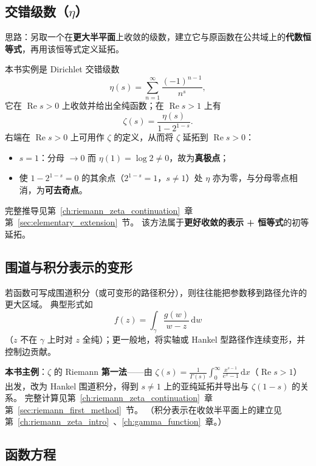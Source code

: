 \subsection{交错级数（$\eta$）}\label{subsec:eta_continuation_method}

思路：另取一个在\textbf{更大半平面}上收敛的级数，建立它与原函数在公共域上的\textbf{代数恒等式}，再用该恒等式定义延拓。

本书实例是 Dirichlet 交错级数
\[
  \eta(s)=\sum_{n=1}^{\infty}\frac{(-1)^{n-1}}{n^s},
\]
它在 $\operatorname{Re}s>0$ 上收敛并给出全纯函数；在 $\operatorname{Re}s>1$ 上有
\[
  \zeta(s)=\frac{\eta(s)}{1-2^{1-s}}.
\]
右端在 $\operatorname{Re}s>0$ 上可用作 $\zeta$ 的定义，从而将 $\zeta$ 延拓到 $\operatorname{Re}s>0$：
\begin{itemize}
  \item $s=1$：分母 $\to 0$ 而 $\eta(1)=\log 2\neq 0$，故为\textbf{真极点}；
  \item 使 $1-2^{1-s}=0$ 的其余点（$2^{1-s}=1$，$s\neq 1$）处 $\eta$ 亦为零，与分母零点相消，为\textbf{可去奇点}。
\end{itemize}
完整推导见第~\ref{ch:riemann_zeta_continuation}~章第~\ref{sec:elementary_extension}~节。
该方法属于\textbf{更好收敛的表示 + 恒等式}的初等延拓。

\subsection{围道与积分表示的变形}\label{subsec:contour_integral_rep}

若函数可写成围道积分（或可变形的路径积分），则往往能把参数移到路径允许的更大区域。
典型形式如
\[
  f(z)=\int_{\gamma}\frac{g(w)}{w-z}\,\mathrm{d}w
\]
（$z$ 不在 $\gamma$ 上时对 $z$ 全纯）；更一般地，将实轴或 Hankel 型路径作连续变形，并控制边贡献。

\textbf{本书主例}：$\zeta$ 的 Riemann \textbf{第一法}——由
$\zeta(s)=\frac1{\Gamma(s)}\int_0^\infty\frac{x^{s-1}}{e^x-1}\,\mathrm{d}x$（$\operatorname{Re}s>1$）
出发，改为 Hankel 围道积分，得到 $s\neq 1$ 上的亚纯延拓并导出与 $\zeta(1-s)$ 的关系。
完整计算见第~\ref{ch:riemann_zeta_continuation}~章第~\ref{sec:riemann_first_method}~节。
（积分表示在收敛半平面上的建立见第~\ref{ch:riemann_zeta_intro}~、\ref{ch:gamma_function}~章。）

\subsection{函数方程}\label{subsec:functional_equation_method}

